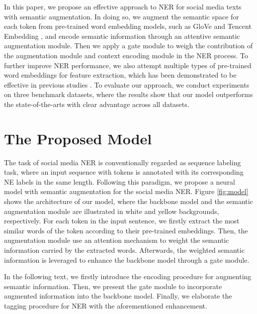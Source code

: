 \documentclass[11pt,a4paper]{article}
\begin{document}
In this paper, we propose an effective approach to NER for social media texts with semantic augmentation. 
In doing so, we augment the semantic space for each token from pre-trained word embedding models, such as GloVe \cite{DBLP:conf/emnlp/PenningtonSM14} and Tencent Embedding \cite{DBLP:conf/naacl/SongSLZ18}, and encode semantic information through an 
attentive semantic
augmentation module.
Then we apply a gate module to weigh the contribution of the augmentation module and context encoding module in the NER process. 
To further improve NER performance, we also attempt multiple types of pre-trained word embeddings for feature extraction, which has been demonstrated to be effective in previous studies \cite{DBLP:conf/coling/AkbikBV18,DBLP:conf/emnlp/JieL19,DBLP:conf/naacl/KasaiFFRR19,DBLP:conf/aaai/KimKK19,DBLP:journals/corr/abs-1911-04474}.
To evaluate our approach, we conduct experiments on three benchmark datasets, where the results show that our model outperforms the state-of-the-arts with clear advantage across all datasets.







\section{The Proposed Model}

The task of social media NER is conventionally regarded as sequence labeling task, where an input sequence  with  tokens is annotated with its corresponding NE labels  in the same length.
Following this paradigm, we propose a neural model with semantic augmentation for the social media NER.
Figure \ref{fig:model} shows the architecture of our model, where the backbone model and the semantic augmentation module are illustrated in white and yellow backgrounds, respectively.
For each token in the input sentence, we firstly extract the most similar words of the token according to their pre-trained embeddings. 
Then, the augmentation module use an attention mechanism to weight the semantic information carried by the extracted words.
Afterwards, the weighted semantic information is leveraged to enhance the backbone model through a gate module.

In the following text, we firstly introduce the encoding procedure for augmenting semantic information.
Then, we present the gate module to incorporate augmented information into the backbone model.
Finally, we elaborate the tagging procedure for NER with the aforementioned enhancement. 
\end{document}
